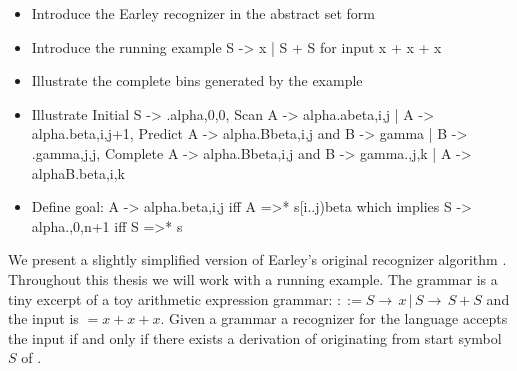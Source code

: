%
\begin{isabellebody}%
%
%
\isadelimtheory
%
\endisadelimtheory
%
\isatagtheory
%
\endisatagtheory
{\isafoldtheory}%
%
\isadelimtheory
%
\endisadelimtheory
%
\isadelimdocument
%
\endisadelimdocument
%
\isatagdocument
%
\isamarkuptrue%
%
\isamarkuptrue%
%
\endisatagdocument
{\isafolddocument}%
%
\isadelimdocument
%
\endisadelimdocument
%
\begin{isamarkuptext}%
\begin{itemize}
    \item Introduce the Earley recognizer in the abstract set form \\
    \item Introduce the running example S -> x | S + S for input x + x + x \\
    \item Illustrate the complete bins generated by the example \\
    \item Illustrate Initial S -> .alpha,0,0, Scan A -> alpha.abeta,i,j | A -> alpha.beta,i,j+1,
      Predict A -> alpha.Bbeta,i,j and B -> gamma | B -> .gamma,j,j,
      Complete A -> alpha.Bbeta,i,j and B -> gamma.,j,k | A -> alphaB.beta,i,k \\
    \item Define goal: A -> alpha.beta,i,j iff A =>* s[i..j)beta which implies S -> alpha.,0,n+1 iff S =>* s \\
  \end{itemize}%
\end{isamarkuptext}\isamarkuptrue%
%
\isadelimdocument
%
\endisadelimdocument
%
\isatagdocument
%
\isamarkuptrue%
%
\endisatagdocument
{\isafolddocument}%
%
\isadelimdocument
%
\endisadelimdocument
%
\begin{isamarkuptext}%
We present a slightly simplified version of Earley's original recognizer algorithm \cite{Earley:1970}.
Throughout this thesis we will work with a running example. The grammar is a tiny excerpt of a toy
arithmetic expression grammar: \isa{{\isasymG}} $::= S \rightarrow \, x \, \vert \, S \rightarrow \, S + S$ and
the input is \isa{{\isasymomega}} $= x + x + x$. Given a grammar \isa{{\isasymG}} a recognizer for the language \isa{{\isasymL}{\isacharunderscore}{\kern0pt}{\isasymG}} accepts the input \isa{{\isasymomega}}
if and only if there exists a derivation of \isa{{\isasymomega}} originating from start symbol $S$ of \isa{{\isasymG}}.


\end{isamarkuptext}
\end{isabellebody}
